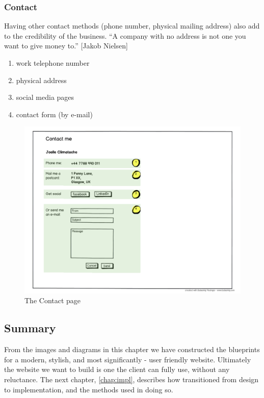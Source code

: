\documentclass{l3proj}
\begin{document}
\subsubsection{Contact}
Having other contact methods (phone number, physical mailing address) also add
to the credibility of the business. ``A company with no address is not one you
want to give money to.'' [Jakob Nielsen]
\begin{enumerate} \itemsep1pt \parskip0pt 
	\item work telephone number
	\item physical address
	\item social media pages
	\item contact form (by e-mail)
\end{enumerate}

\begin{figure}
\label{wireframes:contact}
\begin{center}
\includegraphics[width=\linewidth, trim = 0px 40px 0px 220px]
	{wireframes/contact}
\caption{The Contact page}
\end{center}
\end{figure}

\subsection{Summary}
From the images and diagrams in this chapter we have constructed the blueprints
for a modern, stylish, and most significantly - user friendly website.
Ultimately the website we want to build is one the client can fully use, without
any reluctance. The next chapter, \ref{chap:impl}, describes how transitioned
from design to implementation, and the methods used in doing so.
\end{document}
